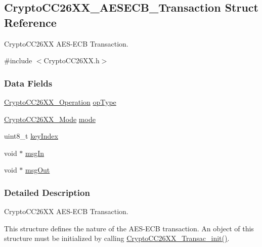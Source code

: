 \subsection{Crypto\+C\+C26\+X\+X\+\_\+\+A\+E\+S\+E\+C\+B\+\_\+\+Transaction Struct Reference}
\label{struct_crypto_c_c26_x_x___a_e_s_e_c_b___transaction}


Crypto\+C\+C26\+X\+X A\+E\+S-\/\+E\+C\+B Transaction.  




{\ttfamily \#include $<$Crypto\+C\+C26\+X\+X.\+h$>$}

\subsubsection*{Data Fields}
\begin{DoxyCompactItemize}
\item 
\hyperlink{_crypto_c_c26_x_x_8h_a28465385e5b45efecc00f2015605f970}{Crypto\+C\+C26\+X\+X\+\_\+\+Operation} \hyperlink{struct_crypto_c_c26_x_x___a_e_s_e_c_b___transaction_a538da4d16f0d7e5fdb2bf3f97bfa81be}{op\+Type}
\item 
\hyperlink{_crypto_c_c26_x_x_8h_abf86c8ac428559f00fed3299d439e2cd}{Crypto\+C\+C26\+X\+X\+\_\+\+Mode} \hyperlink{struct_crypto_c_c26_x_x___a_e_s_e_c_b___transaction_a9dafb34e220b2dfe0ac118df2afc0ae8}{mode}
\item 
uint8\+\_\+t \hyperlink{struct_crypto_c_c26_x_x___a_e_s_e_c_b___transaction_a1e144214803cec502698401343c830a1}{key\+Index}
\item 
void $\ast$ \hyperlink{struct_crypto_c_c26_x_x___a_e_s_e_c_b___transaction_ac63701080bffd789b53c7effcf46cfe9}{msg\+In}
\item 
void $\ast$ \hyperlink{struct_crypto_c_c26_x_x___a_e_s_e_c_b___transaction_ab5c3bff547308f1a63c771349cbef069}{msg\+Out}
\end{DoxyCompactItemize}


\subsubsection{Detailed Description}
Crypto\+C\+C26\+X\+X A\+E\+S-\/\+E\+C\+B Transaction. 

This structure defines the nature of the A\+E\+S-\/\+E\+C\+B transaction. An object of this structure must be initialized by calling \hyperlink{_crypto_c_c26_x_x_8h_afb3ea8faceda234cdd62c5f53e203946}{Crypto\+C\+C26\+X\+X\+\_\+\+Transac\+\_\+init()}. 

